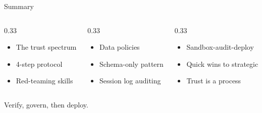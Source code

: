 \documentclass[aspectratio=169]{beamer}
\begin{document}
\begin{frame}{Summary}
\begin{columns}[T]
\begin{column}{0.33\textwidth}
\begin{shadedbox}[title=\textbf{Verification}]
\begin{itemize}\small
  \item The trust spectrum
  \item 4-step protocol
  \item Red-teaming skills
\end{itemize}
\end{shadedbox}
\end{column}
\begin{column}{0.33\textwidth}
\begin{shadedbox}[title=\textbf{Governance}]
\begin{itemize}\small
  \item Data policies
  \item Schema-only pattern
  \item Session log auditing
\end{itemize}
\end{shadedbox}
\end{column}
\begin{column}{0.33\textwidth}
\begin{shadedbox}[title=\textbf{Adoption}]
\begin{itemize}\small
  \item Sandbox-audit-deploy
  \item Quick wins to strategic
  \item Trust is a process
\end{itemize}
\end{shadedbox}
\end{column}
\end{columns}
\vspace{0.5cm}
\begin{center}
\alert{Verify, govern, then deploy.}
\end{center}
\end{frame}
\end{document}
